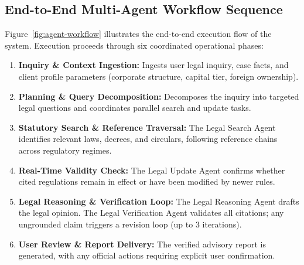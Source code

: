 \documentclass[10pt,a4paper]{article}
\begin{document}
\subsection{End-to-End Multi-Agent Workflow Sequence}

Figure~\ref{fig:agent-workflow} illustrates the end-to-end execution flow of the system. Execution proceeds through six coordinated operational phases:

\begin{enumerate}[label=\textbf{Phase \arabic*:}, leftmargin=18pt]
  \item \textbf{Inquiry \& Context Ingestion:} Ingests user legal inquiry, case facts, and client profile parameters (corporate structure, capital tier, foreign ownership).
  \item \textbf{Planning \& Query Decomposition:} Decomposes the inquiry into targeted legal questions and coordinates parallel search and update tasks.
  \item \textbf{Statutory Search \& Reference Traversal:} The Legal Search Agent identifies relevant laws, decrees, and circulars, following reference chains across regulatory regimes.
  \item \textbf{Real-Time Validity Check:} The Legal Update Agent confirms whether cited regulations remain in effect or have been modified by newer rules.
  \item \textbf{Legal Reasoning \& Verification Loop:} The Legal Reasoning Agent drafts the legal opinion. The Legal Verification Agent validates all citations; any ungrounded claim triggers a revision loop (up to 3 iterations).
  \item \textbf{User Review \& Report Delivery:} The verified advisory report is generated, with any official actions requiring explicit user confirmation.
\end{enumerate}
\end{document}
